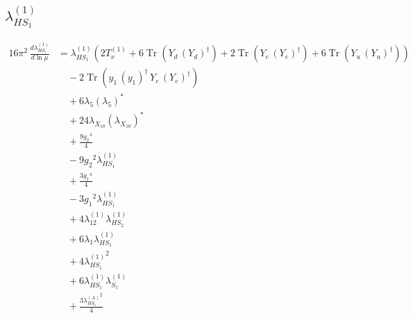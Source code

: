 \documentclass[10pt,a4paper]{article}
\begin{document}
\subsection*{$\lambda_{HS_1}^{(1)}$}
\begin{align*}
16\pi^2\,\frac{d \lambda_{HS_1}^{(1)}}{d\ln\mu} &={\lambda_{HS_1}^{(1)}} (2 T_{\nu}^{(1)}+6 \operatorname{Tr}\!\left({Y_d}\,\left({Y_d}\right)^{\dagger}\right)+2 \operatorname{Tr}\!\left({Y_e}\,\left({Y_e}\right)^{\dagger}\right)+6 \operatorname{Tr}\!\left({Y_u}\,\left({Y_u}\right)^{\dagger}\right)) \\
&\quad -2 \operatorname{Tr}\!\left({y_1}\,\left({y_1}\right)^{\dagger}\,{Y_e}\,\left({Y_e}\right)^{\dagger}\right) \\
&\quad +6 {\lambda_5} \left({\lambda_5}\right)^{*} \\
&\quad +24 {\lambda_{X_{10}}} \left({\lambda_{X_{10}}}\right)^{*} \\
&\quad +\frac{9 {g_2}^4}{4} \\
&\quad -9 {g_2}^2 {\lambda_{HS_1}^{(1)}} \\
&\quad +\frac{3 {g_1}^4}{4} \\
&\quad -3 {g_1}^2 {\lambda_{HS_1}^{(1)}} \\
&\quad +4 {\lambda_{12}^{(1)}} {\lambda_{HS_2}^{(1)}} \\
&\quad +6 {\lambda_1} {\lambda_{HS_1}^{(1)}} \\
&\quad +4 {\lambda_{HS_1}^{(1)}}^2 \\
&\quad +6 {\lambda_{HS_1}^{(1)}} {\lambda_{S_1}^{(1)}} \\
&\quad +\frac{3 {\lambda_{HS_1}^{(A)}}^2}{4} \\
\end{align*}
\end{document}
